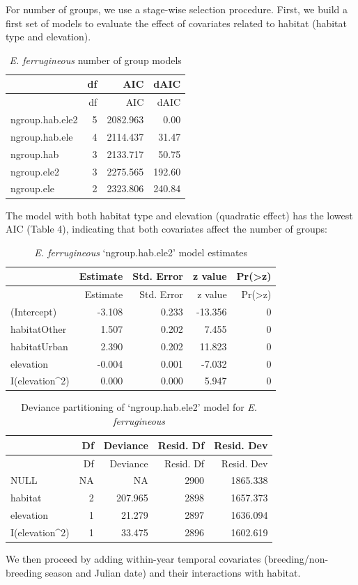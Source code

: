 \documentclass[]{article}
\begin{document}
For number of groups, we use a stage-wise selection procedure. First, we
build a first set of models to evaluate the effect of covariates related
to habitat (habitat type and elevation).

\begin{longtable}[]{@{}lrrr@{}}
\caption{\textit{E. ferrugineous} number of group models}\tabularnewline
\toprule
& df & AIC & dAIC\tabularnewline
\midrule
\endfirsthead
\toprule
& df & AIC & dAIC\tabularnewline
\midrule
\endhead
ngroup.hab.ele2 & 5 & 2082.963 & 0.00\tabularnewline
ngroup.hab.ele & 4 & 2114.437 & 31.47\tabularnewline
ngroup.hab & 3 & 2133.717 & 50.75\tabularnewline
ngroup.ele2 & 3 & 2275.565 & 192.60\tabularnewline
ngroup.ele & 2 & 2323.806 & 240.84\tabularnewline
\bottomrule
\end{longtable}

The model with both habitat type and elevation (quadratic effect) has
the lowest AIC (Table 4), indicating that both covariates affect the
number of groups:

\begin{longtable}[]{@{}lrrrr@{}}
\caption{\textit{E. ferrugineous} `ngroup.hab.ele2' model
estimates}\tabularnewline
\toprule
& Estimate & Std. Error & z value &
Pr(\textgreater{}\textbar{}z\textbar{})\tabularnewline
\midrule
\endfirsthead
\toprule
& Estimate & Std. Error & z value &
Pr(\textgreater{}\textbar{}z\textbar{})\tabularnewline
\midrule
\endhead
(Intercept) & -3.108 & 0.233 & -13.356 & 0\tabularnewline
habitatOther & 1.507 & 0.202 & 7.455 & 0\tabularnewline
habitatUrban & 2.390 & 0.202 & 11.823 & 0\tabularnewline
elevation & -0.004 & 0.001 & -7.032 & 0\tabularnewline
I(elevation\^{}2) & 0.000 & 0.000 & 5.947 & 0\tabularnewline
\bottomrule
\end{longtable}

\begin{longtable}[]{@{}lrrrr@{}}
\caption{Deviance partitioning of `ngroup.hab.ele2' model for
\textit{E. ferrugineous}}\tabularnewline
\toprule
& Df & Deviance & Resid. Df & Resid. Dev\tabularnewline
\midrule
\endfirsthead
\toprule
& Df & Deviance & Resid. Df & Resid. Dev\tabularnewline
\midrule
\endhead
NULL & NA & NA & 2900 & 1865.338\tabularnewline
habitat & 2 & 207.965 & 2898 & 1657.373\tabularnewline
elevation & 1 & 21.279 & 2897 & 1636.094\tabularnewline
I(elevation\^{}2) & 1 & 33.475 & 2896 & 1602.619\tabularnewline
\bottomrule
\end{longtable}

We then proceed by adding within-year temporal covariates
(breeding/non-breeding season and Julian date) and their interactions
with habitat.
\end{document}
